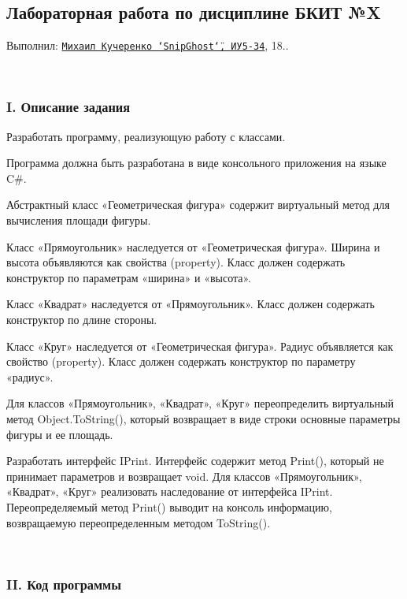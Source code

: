 \subsection*{Лабораторная работа по дисциплине БКИТ №X}

Выполнил\+: \href{https://vk.com/snipghost}{\tt Михаил Кучеренко \char`\"{}\+Snip\+Ghost\char`\"{}, ИУ5-\/34}, 18.. 

~\newline


\subsubsection*{I. Описание задания}

Разработать программу, реализующую работу с классами.
\begin{DoxyEnumerate}
\item Программа должна быть разработана в виде консольного приложения на языке C\#.
\item Абстрактный класс «Геометрическая фигура» содержит виртуальный метод для вычисления площади фигуры.
\item Класс «Прямоугольник» наследуется от «Геометрическая фигура». Ширина и высота объявляются как свойства (property). Класс должен содержать конструктор по параметрам «ширина» и «высота».
\item Класс «Квадрат» наследуется от «Прямоугольник». Класс должен содержать конструктор по длине стороны.
\item Класс «Круг» наследуется от «Геометрическая фигура». Радиус объявляется как свойство (property). Класс должен содержать конструктор по параметру «радиус».
\item Для классов «Прямоугольник», «Квадрат», «Круг» переопределить виртуальный метод Object.\+To\+String(), который возвращает в виде строки основные параметры фигуры и ее площадь.
\item Разработать интерфейс I\+Print. Интерфейс содержит метод Print(), который не принимает параметров и возвращает void. Для классов «Прямоугольник», «Квадрат», «Круг» реализовать наследование от интерфейса I\+Print. Переопределяемый метод Print() выводит на консоль информацию, возвращаемую переопределенным методом To\+String(). 
\end{DoxyEnumerate}

~\newline


\subsubsection*{II. Код программы}



